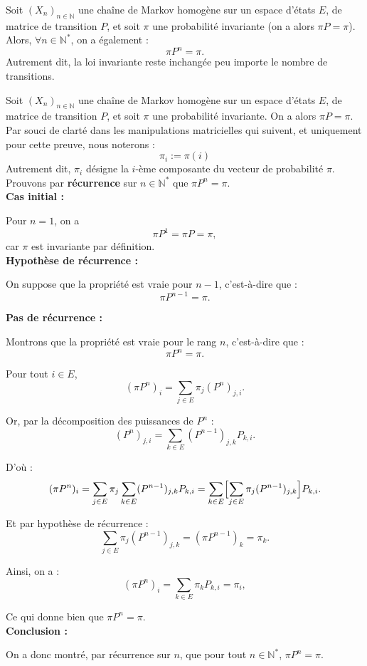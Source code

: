 \documentclass{article}
\begin{document}
\begin{tcolorbox}[colback=white,colframe=blue!80!black,title={Invariance aux puissances de la matrice}]
Soit $(X_n)_{n\in\mathbb{N}}$ une chaîne de Markov homogène sur un espace d'états $E$, de matrice de transition $P$, et soit $\pi$ une probabilité invariante (on a alors $\pi P = \pi$). \\

Alors, $\forall n \in \mathbb{N}^{*}$, on a également :
\[
\pi P^n = \pi.
\]
Autrement dit, la loi invariante reste inchangée peu importe le nombre de transitions.
\end{tcolorbox}

\begin{tcolorbox}[colback=white,colframe=green!80!black,title=Démonstration,breakable]
Soit $(X_n)_{n\in\mathbb{N}}$ une chaîne de Markov homogène sur un espace d'états $E$, de matrice de transition $P$, et soit $\pi$ une probabilité invariante.
On a alors $\pi P = \pi$. \\

Par souci de clarté dans les manipulations matricielles qui suivent, et uniquement pour cette preuve, nous noterons :
\[
\pi_i := \pi(i)
\]
Autrement dit, $\pi_i$ désigne la $i$-ème composante du vecteur de probabilité $\pi$. \\

Prouvons par \textbf{récurrence} sur $n \in \mathbb{N}^*$ que $\pi P^n = \pi$. \\

\textbf{Cas initial :}

Pour $n=1$, on a
\[
  \pi P^1 = \pi P = \pi,
\]
car $\pi$ est invariante par définition. \\

\textbf{Hypothèse de récurrence :}

On suppose que la propriété est vraie pour $n-1$, c'est-à-dire que :
\[
  \pi P^{n-1} = \pi.
\]

\textbf{Pas de récurrence :}

Montrons que la propriété est vraie pour le rang $n$, c'est-à-dire que :
\[
  \pi P^n = \pi.
\]

Pour tout $i \in E$,
\[
  (\pi P^n)_i = \sum_{j \in E} \pi_j (P^n)_{j,i}.
\]

Or, par la décomposition des puissances de $P^n$ :
\[
  (P^n)_{j,i} = \sum_{k \in E} (P^{n-1})_{j,k} P_{k,i}.
\]

D'où :
\[
  (\pi P^n)_i
  = \sum_{j \in E} \pi_j \sum_{k \in E} (P^{n-1})_{j,k} P_{k,i}
  = \sum_{k \in E} \Bigl[\sum_{j \in E} \pi_j (P^{n-1})_{j,k}\Bigr] P_{k,i}.
\]

Et par hypothèse de récurrence :
\[
  \sum_{j \in E} \pi_j (P^{n-1})_{j,k}
  = (\pi P^{n-1})_k
  = \pi_k.
\]

Ainsi, on a :
\[
  (\pi P^n)_i
  = \sum_{k \in E} \pi_k P_{k,i}
  = \pi_i,
\]

Ce qui donne bien que $\pi P^n = \pi$. \\

\textbf{Conclusion :}

On a donc montré, par récurrence sur $n$, que pour tout $n \in \mathbb{N}^*$, $\pi P^n = \pi$.
\end{tcolorbox}
\end{document}
